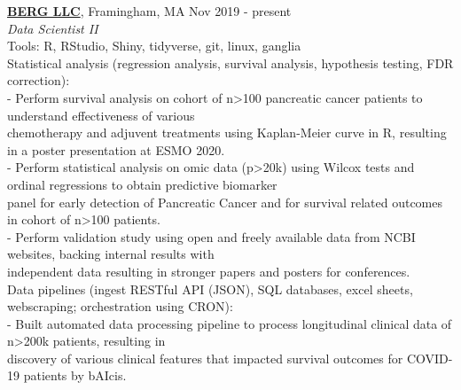 \documentclass[a4paper]{article}
\newcommand{\mybullet}{
	\indent 
  \textbullet \hspace*{2mm}
}
\newcommand{\mysubbullet}{
	\indent 
  - \hspace*{2mm}
}
\begin{document}
  \noindent
  \textbf{\href{https://www.berghealth.com/}{BERG LLC}}, Framingham, MA 
  \hfill Nov 2019 - present \\
  \textit{Data Scientist II} \\
  Tools: R, RStudio, Shiny, tidyverse, git, linux, ganglia \\
  \mybullet Statistical analysis (regression analysis, survival analysis, hypothesis testing, FDR correction): \\
  \mysubbullet Perform survival analysis on cohort of n>100 pancreatic cancer patients to understand effectiveness of various \\\hspace*{10mm}chemotherapy and adjuvent treatments using Kaplan-Meier curve in R, resulting in a poster presentation at ESMO 2020. \\
  \mysubbullet Perform statistical analysis on omic data (p>20k) using Wilcox tests and ordinal regressions to obtain predictive biomarker \\\hspace*{10mm}panel for early detection of Pancreatic Cancer and for survival related outcomes in cohort of n>100 patients. \\
  \mysubbullet Perform validation study using open and freely available data from NCBI websites, backing internal results with \\\hspace*{10mm}independent data resulting in stronger papers and posters for conferences. \\
  \mybullet Data pipelines (ingest RESTful API (JSON), SQL databases, excel sheets, webscraping; orchestration using CRON): \\
  \mysubbullet Built automated data processing pipeline to process longitudinal clinical data of n>200k patients, resulting in \\\hspace*{10mm}discovery of various clinical features that impacted survival outcomes for COVID-19 patients by bAIcis\textregistered. \\
\end{document}
